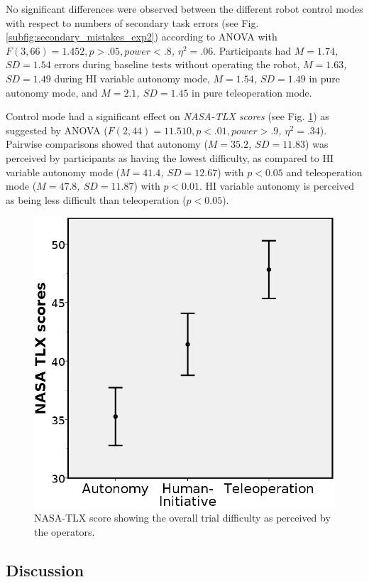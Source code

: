 \documentclass[a4paper,12pt,oneside,openright]{bhamthesis}
\begin{document}
No significant differences were observed between the different robot control modes with respect to numbers of secondary task errors (see Fig. \ref{subfig:secondary_mistakes_exp2}) according to ANOVA with \textit{$F(3,66) = 1.452, p > .05 , power < .8$, $\eta^2 = .06$}. Participants had \textit{$M = 1.74$, $SD = 1.54$} errors during baseline tests without operating the robot, \textit{$M = 1.63$, $SD = 1.49$} during HI variable autonomy mode, \textit{$M = 1.54$, $SD = 1.49$} in pure autonomy mode, and \textit{$M = 2.1$, $SD = 1.45$} in pure teleoperation mode.

Control mode had a significant effect on \textit{NASA-TLX scores} (see Fig. \ref{fig:NASA-TLX_exp2}) as suggested by ANOVA (\textit{$F(2,44) = 11.510, p < .01 , power > .9$, $\eta^2 = .34$}). Pairwise comparisons showed that autonomy (\textit{$M = 35.2$, $SD = 11.83$}) was perceived by participants as having the lowest difficulty, as compared to HI variable autonomy mode (\textit{$M = 41.4$, $SD = 12.67$}) with $p < 0.05$ and teleoperation mode (\textit{$M = 47.8$, $SD = 11.87$}) with $p < 0.01$. HI variable autonomy is perceived as being less difficult than teleoperation ($p < 0.05$). 

\begin{figure}
	\centering
	\includegraphics[width=0.49\columnwidth]{chapter4_fig/NasaTLX.png}
	\caption{NASA-TLX score showing the overall trial difficulty as perceived by the operators.} 
	\label{fig:NASA-TLX_exp2}
\end{figure}

\subsection{Discussion}
\end{document}
